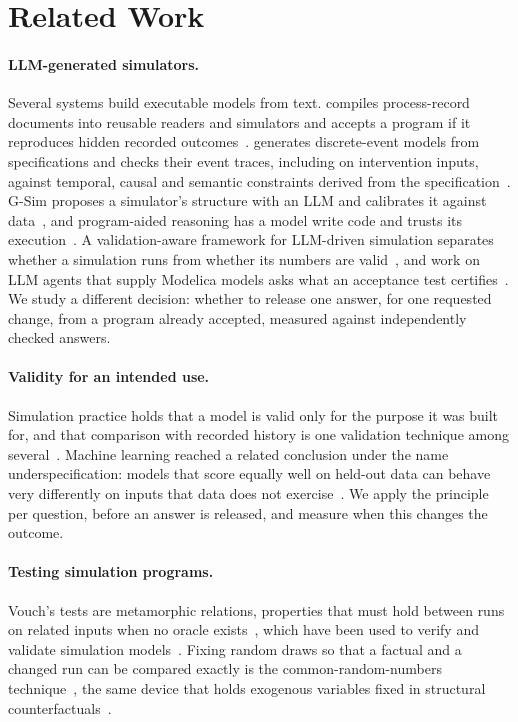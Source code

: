 \section{Related Work}
\label{sec:related}

\paragraph{LLM-generated simulators.} Several systems build executable models from text. \otf compiles process-record documents into reusable readers and simulators and accepts a program if it reproduces hidden recorded outcomes~\cite{otftools2026}. \devs generates discrete-event models from specifications and checks their event traces, including on intervention inputs, against temporal, causal and semantic constraints derived from the specification~\cite{chen2026devs}. G-Sim proposes a simulator's structure with an LLM and calibrates it against data~\cite{holt2025gsim}, and program-aided reasoning has a model write code and trusts its execution~\cite{gao2023pal}. A validation-aware framework for LLM-driven simulation separates whether a simulation runs from whether its numbers are valid~\cite{yoo2026validation}, and work on LLM agents that supply Modelica models asks what an acceptance test certifies~\cite{frochte2026modelica}. We study a different decision: whether to release one answer, for one requested change, from a program already accepted, measured against independently checked answers.

\paragraph{Validity for an intended use.} Simulation practice holds that a model is valid only for the purpose it was built for, and that comparison with recorded history is one validation technique among several~\cite{sargent2013vv}. Machine learning reached a related conclusion under the name underspecification: models that score equally well on held-out data can behave very differently on inputs that data does not exercise~\cite{damour2022underspecification}. We apply the principle per question, before an answer is released, and measure when this changes the outcome.

\paragraph{Testing simulation programs.} Vouch's tests are metamorphic relations, properties that must hold between runs on related inputs when no oracle exists~\cite{chen2018metamorphic,segura2016survey}, which have been used to verify and validate simulation models~\cite{raunak2021metamorphic}. Fixing random draws so that a factual and a changed run can be compared exactly is the common-random-numbers technique~\cite{law2015simulation}, the same device that holds exogenous variables fixed in structural counterfactuals~\cite{pearl2009causality}.

